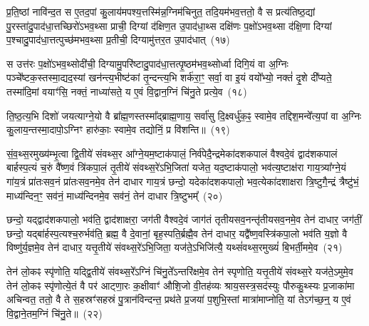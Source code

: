 प्र॒ति॒ष्ठां नावि॑न्द॒त स ए॒तद॒पां कु॒लाय॑मपश्य॒त्तस्मि॑न्न॒ग्निम॑चिनुत॒ तदि॒यम॑भव॒त्ततो॒ वै स प्रत्य॑तिष्ठ॒द्यां पु॒रस्ता॑दु॒पा\-द॑धा॒त्तच्छिरो॑\-ऽभव॒थ्सा प्राची॒ दिग्यां द॑क्षिण॒त उ॒पाद॑धा॒थ्स दक्षि॑णः प॒क्षो॑\-ऽभव॒थ्सा द॑क्षि॒णा दिग्यां प॒श्चादु॒पा\-द॑धा॒त्तत्पुच्छ॑मभव॒थ्सा प्र॒तीची॒ दिग्यामु॑त्तर॒त उ॒पाद॑धात्~(१७)

स उत्त॑रः प॒क्षो॑\-ऽभव॒थ्सोदी॑ची॒ दिग्यामु॒परि॑ष्टादु॒पाद॑धा॒त्तत्पृ॒ष्ठम॑भव॒थ्सोर्ध्वा दिगि॒यं वा अ॒ग्निः पञ्चे᳚ष्टक॒स्तस्मा॒द्यद॒स्यां खन॑न्त्य॒भीष्ट॑कां तृ॒न्दन्त्य॒भि शर्क॑रा॒ꣳ॒ सर्वा॒ वा इ॒यं वयो᳚भ्यो॒ नक्तं॑ दृ॒शे दी᳚प्यते॒ तस्मा॑दि॒मां वयाꣳ॑सि॒ नक्तं॒ नाध्या॑सते॒ य ए॒वं वि॒द्वान॒ग्निं चि॑नु॒ते प्रत्ये॒व~(१८)

ति॒ष्ठ॒त्य॒भि दिशो॑ जयत्याग्ने॒यो वै ब्रा᳚ह्म॒णस्तस्मा᳚द्ब्राह्म॒णाय॒ सर्वा॑सु दि॒क्ष्वर्धु॑क॒ꣴ॒ स्वामे॒व तद्दिश॒मन्वे᳚त्य॒पां वा अ॒ग्निः कु॒लाय॒न्तस्मा॒दापो॒\-ऽग्निꣳ हारु॑काः॒ स्वामे॒व तद्योनिं॒ प्र वि॑शन्ति॥~(१९)

{\anuvakamend[{यद॑लेलाय॒थ्स उ॑त्तर॒त उ॒पाद॑धादे॒व द्वात्रिꣳ॑शच्च}]}%

सं॒व॒थ्स॒रमुख्य॑म्भृ॒त्वा द्वि॒तीये॑ संवथ्स॒र आ᳚ग्ने॒यम॒ष्टा\-क॑पालं॒ निर्व॑पेदै॒न्द्रमेका॑\-दश\-कपालं वैश्वदे॒वं द्वाद॑श\-कपालं बार्\mbox{}हस्प॒त्यं च॒रुं वै᳚ष्ण॒वं त्रि॑कपा॒लं तृ॒तीये॑ संवथ्स॒रे॑\-ऽभि॒जिता॑ यजेत॒ यद॒ष्टाक॑पालो॒ भव॑त्य॒ष्टाक्ष॑रा गाय॒त्र्या᳚ग्ने॒यं गा॑य॒त्रं प्रा॑तःसव॒नं प्रा॑तःसव॒नमे॒व तेन॑ दाधार गाय॒त्रं छन्दो॒ यदेका॑\-दश\-कपालो॒ भव॒त्येका॑\-दशाक्षरा त्रि॒ष्टुगै॒न्द्रं त्रैष्टु॑भं॒ माध्य॑न्दिन॒ꣳ॒ सव॑नं॒ माध्य॑न्दिनमे॒व सव॑नं॒ तेन॑ दाधार त्रि॒ष्टुभम्᳚~(२०)

छन्दो॒ यद्द्वाद॑श\-कपालो॒ भव॑ति॒ द्वाद॑शाक्षरा॒ जग॑ती वैश्वदे॒वं जाग॑तं तृतीयसव॒नन्तृ॑तीयसव॒नमे॒व तेन॑ दाधार॒ जग॑तीं॒ छन्दो॒ यद्बा॑र्\mbox{}हस्प॒त्यश्च॒रुर्भव॑ति॒ ब्रह्म॒ वै दे॒वानां॒ बृह॒स्पति॒र्ब्रह्मै॒व तेन॑ दाधार॒ यद्वै᳚ष्ण॒वस्त्रि॑कपा॒लो भव॑ति य॒ज्ञो वै विष्णु॑र्य॒ज्ञमे॒व तेन॑ दाधार॒ यत्तृ॒तीये॑ संवथ्स॒रे॑\-ऽभि॒जिता॒ यज॑ते॒\-ऽभिजि॑त्यै॒ यथ्सं॑वथ्स॒रमुख्यं॑ बि॒भर्ती॒ममे॒व~(२१)

तेन॑ लो॒कꣴ स्पृ॑णोति॒ यद्द्वि॒तीये॑ संवथ्स॒रे᳚\-ऽग्निं चि॑नु॒ते᳚\-ऽन्तरि॑क्षमे॒व तेन॑ स्पृणोति॒ यत्तृ॒तीये॑ संवथ्स॒रे यज॑ते॒\-ऽमुमे॒व तेन॑ लो॒कꣴ स्पृ॑णोत्ये॒तं वै पर॑ आट्णा॒रः क॒क्षीवाꣳ॑ औशि॒जो वी॒तह॑व्यः श्राय॒सस्त्र॒सद॑स्युः पौरुकु॒थ्स्यः प्र॒जाका॑मा अचिन्वत॒ ततो॒ वै ते स॒हस्रꣳ॑सहस्रं पु॒त्रान॑विन्दन्त॒ प्रथ॑ते प्र॒जया॑ प॒शुभि॒स्तां मात्रा॑माप्नोति॒ यां ते\-ऽग॑च्छ॒न्॒ य ए॒वं वि॒द्वाने॒तम॒ग्निं चि॑नु॒ते॥~(२२)

{\anuvakamend[{दा॒धा॒र॒ त्रि॒ष्टुभ॑मि॒ममे॒वैवं च॒त्वारि॑ च}]}%

